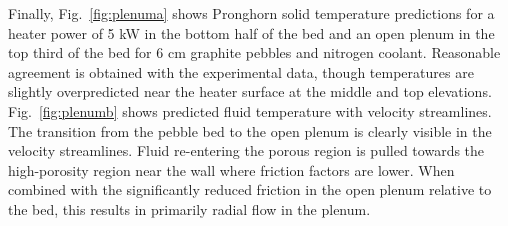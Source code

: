 Finally, Fig.\ \ref{fig:plenuma} shows Pronghorn solid temperature predictions for a heater power of 5 \si{\kilo\watt} in the bottom half of the bed and an open plenum in the top third of the bed for 6 \si{\centi\meter} graphite pebbles and nitrogen coolant. Reasonable agreement is obtained with the experimental data, though temperatures are slightly overpredicted near the heater surface at the middle and top elevations. Fig.\ \ref{fig:plenumb} shows predicted fluid temperature with velocity streamlines. The transition from the pebble bed to the open plenum is clearly visible in the velocity streamlines. Fluid re-entering the porous region is pulled towards the high-porosity region near the wall where friction factors are lower. When combined with the significantly reduced friction in the open plenum relative to the bed, this results in primarily radial flow in the plenum.


